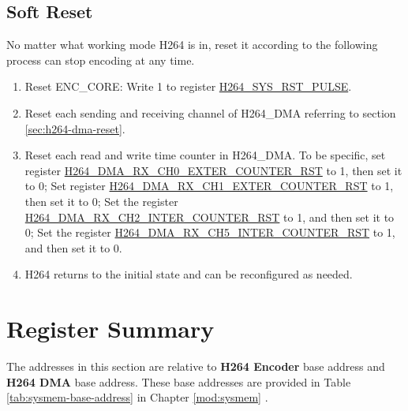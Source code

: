 \documentclass[main\_\_EN.tex]{subfiles}
\begin{document}
\subsection{Soft Reset}\label{sec:h264-soft-rst}
No matter what working mode H264 is in, reset it according to the following process can stop encoding at any time.
\begin{enumerate}
    \item Reset ENC\_CORE: Write 1 to register \hyperref[fielddesc:H264SYSRSTPULSE]{H264\_SYS\_RST\_PULSE}.
    \item Reset each sending and receiving channel of H264\_DMA referring to section \ref{sec:h264-dma-reset}.
    \item Reset each read and write time counter in H264\_DMA. To be specific, set register \hyperref[fielddesc:H264DMARXCH0EXTERCOUNTERRST]{H264\_DMA\_RX\_CH0\_EXTER\_COUNTER\_RST} to 1, then set it to 0; Set register \hyperref[fielddesc:H264DMARXCH1EXTERCOUNTERRST]{H264\_DMA\_RX\_CH1\_EXTER\_COUNTER\_RST} to 1, then set it to 0; Set the register \hyperref[fielddesc:H264DMARXCH2INTERCOUNTERRST]{H264\_DMA\_RX\_CH2\_INTER\_COUNTER\_RST} to 1, and then set it to 0; Set the register \hyperref[fielddesc:H264DMARXCH5INTERCOUNTERRST]{H264\_DMA\_RX\_CH5\_INTER\_COUNTER\_RST} to 1, and then set it to 0.
    \item H264 returns to the initial state and can be reconfigured as needed.
\end{enumerate}
















\clearpage
\section{Register Summary}

The addresses in this section are relative to \textbf{H264 Encoder} base address and \textbf{H264 DMA} base address. These base addresses are provided in Table \ref{tab:sysmem-base-address}  \textit{} in Chapter \ref{mod:sysmem} \textit{}.
\end{document}
